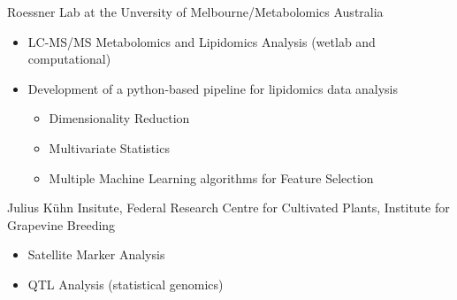 {%
	}
{%
	Roessner Lab at the Unversity of Melbourne/Metabolomics Australia
}
{%
	\vspace*{.07cm}
	\begin{itemize}
		\item LC-MS/MS Metabolomics and Lipidomics Analysis (wetlab and computational)
		\item Development of a python-based pipeline for lipidomics data analysis
		\begin{itemize}
			\item Dimensionality Reduction
			\item Multivariate Statistics
			\item Multiple Machine Learning algorithms for Feature Selection
		\end{itemize}
	\end{itemize}
}

{%
}
{%
	Julius K\"uhn Insitute, Federal Research Centre for Cultivated Plants, Institute for Grapevine Breeding
}
{%
	\vspace*{.07cm}
	\begin{itemize}
		\item Satellite Marker Analysis
		\item QTL Analysis (statistical genomics)
	\end{itemize}
}

